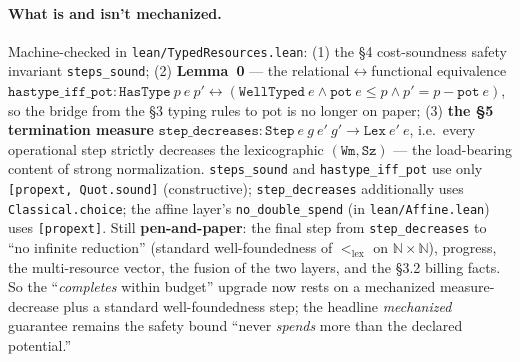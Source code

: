 \documentclass[11pt]{article}
\theoremstyle{plain}
\newcommand{\pot}{\mathrm{pot}}
\begin{document}
\paragraph{What is and isn't mechanized.}
Machine-checked in \texttt{lean/TypedResources.lean}: (1) the \S4 cost-soundness safety invariant
\texttt{steps\_sound}; (2) \textbf{Lemma~0} --- the relational$\leftrightarrow$functional
equivalence
$\texttt{hastype\_iff\_pot} : \texttt{HasType}\ p\ e\ p' \leftrightarrow
(\texttt{WellTyped}\ e \wedge \texttt{pot}\ e \le p \wedge p' = p - \texttt{pot}\ e)$,
so the bridge from the \S3 typing rules to $\pot$ is no longer on paper; (3) \textbf{the \S5
termination measure} $\texttt{step\_decreases} : \texttt{Step}\ e\ g\ e'\ g' \to
\texttt{Lex}\ e'\ e$, i.e.\ every operational step strictly decreases the lexicographic
$(\texttt{Wm}, \texttt{Sz})$ --- the load-bearing content of strong normalization.
\texttt{steps\_sound} and \texttt{hastype\_iff\_pot} use only \texttt{[propext, Quot.sound]}
(constructive); \texttt{step\_decreases} additionally uses \texttt{Classical.choice}; the affine
layer's \texttt{no\_double\_spend} (in \texttt{lean/Affine.lean}) uses \texttt{[propext]}. Still
\textbf{pen-and-paper}: the final step from \texttt{step\_decreases} to ``no infinite reduction''
(standard well-foundedness of $<_{\mathrm{lex}}$ on $\mathbb{N} \times \mathbb{N}$), progress, the
multi-resource vector, the fusion of the two layers, and the \S3.2 billing facts. So the
``\emph{completes} within budget'' upgrade now rests on a mechanized measure-decrease plus a
standard well-foundedness step; the headline \emph{mechanized} guarantee remains the safety bound
``never \emph{spends} more than the declared potential.''
\end{document}
